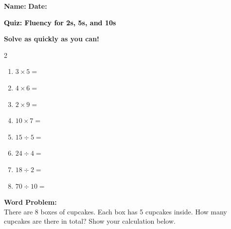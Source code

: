 \documentclass[12pt, letterpaper, fleqn]{article}
\newcommand{\blank}{\underline{\hspace{2.2cm}}}
\begin{document}
\textbf{Name:} \underline{\hspace{5cm}}
\hfill
\textbf{Date:} \underline{\hspace{3cm}}\\

\begin{tcolorbox}[colback=customteal!20]
    \large\textcolor{black}{\textbf{Quiz: Fluency for 2s, 5s, and 10s}}
\end{tcolorbox}

\vspace{5mm}
\noindent
\textbf{Solve as quickly as you can!}

\vspace{5mm}
\begin{multicols}{2}
\begin{enumerate}[itemsep=1.2cm]
\item $3 \times 5 =$ \blank
\item $4 \times 6 =$ \blank
\item $2 \times 9 =$ \blank
\item $10 \times 7 =$ \blank
\item $15 \div 5 =$ \blank
\item $24 \div 4 =$ \blank
\item $18 \div 2 =$ \blank
\item $70 \div 10 =$ \blank
\end{enumerate}
\end{multicols}

\vspace{1.5cm}
\noindent
\textbf{Word Problem:}
\\
\noindent
There are 8 boxes of cupcakes. Each box has 5 cupcakes inside. How many cupcakes are there in total? Show your calculation below.
\vspace{3cm}
\end{document}
